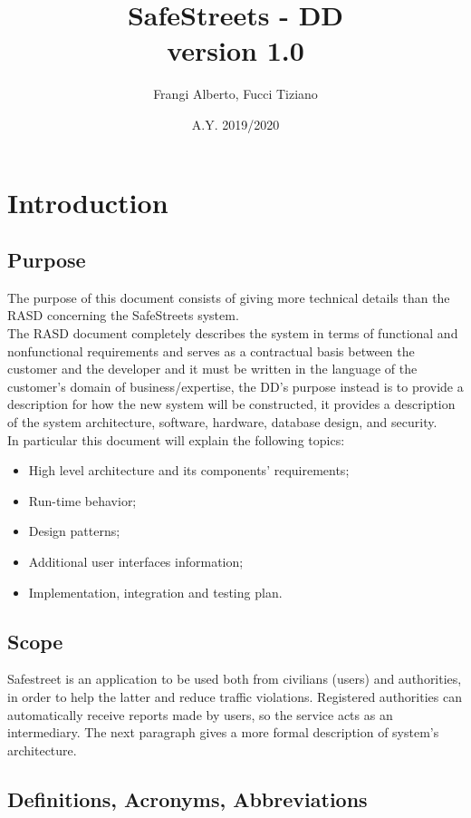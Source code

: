 \documentclass[12pt,a4paper]{report}
\title{SafeStreets - DD \\ \large version 1.0}
\author{Frangi Alberto, Fucci Tiziano}
\date{A.Y. 2019/2020}
\begin{document}
	\maketitle
	\tableofcontents 
	\chapter{Introduction}
		\section{Purpose}
			The purpose of this document consists of giving more technical details than the RASD concerning the SafeStreets
			system.\\
			The RASD document completely describes the system in terms of functional and nonfunctional requirements and
			serves as a contractual basis between the customer and the developer and it must be written in the language of
			the customer's domain of business/expertise, the DD's purpose instead is to provide a description for how the new
			system will be constructed, it provides a description of the system architecture, software, hardware, database
			design, and security.\\
			In particular this document will explain the following topics:
			\begin{itemize}
				\item High level architecture and its components' requirements;
				\item Run-time behavior;
				\item Design patterns;
				\item Additional user interfaces information;
				\item Implementation, integration and testing plan.
			\end{itemize}
		\section{Scope}
			Safestreet is an application to be used both from civilians (users) and authorities, in order to help the latter and
			reduce traffic violations. Registered authorities can automatically receive reports made by users, so the service acts
			as an intermediary. The next paragraph gives a more formal description of system's architecture.

		\section{Definitions, Acronyms, Abbreviations}
\end{document}
